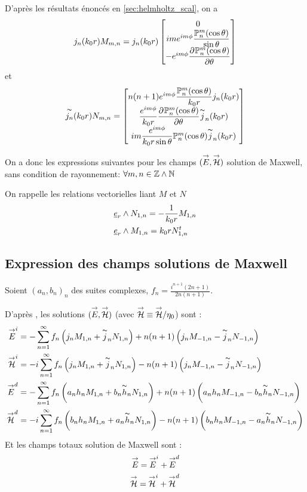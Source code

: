 D'après les résultats énoncés en \ref{sec:helmholtz_scal}, on a
\[
  j_n(k_0r)M_{m,n} = j_n(k_0r)
  \begin{bmatrix}
    0\\
    ime^{im\phi}\dfrac{\mathbb{P}^m_n(\cos\theta)}{\sin\theta}\\
    -e^{im\phi}\dfrac{\partial^{{}} \mathbb{P}^m_n(\cos\theta)}{{\partial \theta}^{{}}}\\
  \end{bmatrix}
\]
et 
\[
  \overset{\thicksim}{j_n}(k_0r)N_{m,n}=
    \begin{bmatrix}
    n(n+1)e^{im\phi}\dfrac{\mathbb{P}^m_n(\cos\theta)}{k_0r}j_n(k_0r)\\
    \dfrac{e^{im\phi}}{k_0r}\dfrac{\partial^{{}} \mathbb{P}^m_n(\cos\theta)}{{\partial \theta}^{{}}}\overset{\thicksim}{j}_n(k_0r)\\
    im\dfrac{e^{im\phi}}{k_0r\sin\theta}\mathbb{P}^m_n(\cos\theta)\overset{\thicksim}{j}_n(k_0r)
  \end{bmatrix}
\]

On a donc les expressions suivantes pour les champs $({\overset{\rightarrow}{E}},{\overset{\rightarrow}{\mathcal{H}}})$ solution de Maxwell, sans condition de rayonnement:
$\forall m,n \in \mathbb Z\wedge\mathbb N$




On rappelle les relations vectorielles liant $M$ et $N$
\begin{align*}
  &\underline{e}_r \wedge N_{1,n} = -\dfrac{1}{k_0r}M_{1,n} \\
  &\underline{e}_r \wedge M_{1,n} = k_0r N_{1,n}^t
\end{align*}

\subsection{Expression des champs solutions de Maxwell}
Soient $(a_n,b_n)_n$ des suites complexes, $f_n = \frac{i^{n+1}(2n+1)}{2n(n+1)}$.

D’après \cite{morse_methods_1953}, les solutions $({\overset{\rightarrow}{E}},{\overset{\rightarrow}{\mathcal{H}}})$ (avec ${\overset{\rightarrow}{\mathcal{H}}} \equiv {\overset{\rightarrow}{\mathcal{H}}} /\eta_0 $) sont :
\begin{align*}
  {\overset{\rightarrow}{E}}^i &= -\sum_{n=1}^\infty f_n \left( j_nM_{1,n} + \overset{\thicksim}{j}_n N_{1,n} \right) + n(n+1)\left(j_n M_{-1,n} - \overset{\thicksim}{j}_nN_{-1,n} \right)\\
  {\overset{\rightarrow}{\mathcal{H}}}^i &= -i\sum_{n=1}^\infty f_n \left( j_nM_{1,n} + \overset{\thicksim}{j}_nN_{1,n} \right) - n(n+1)\left(j_n M_{-1,n} - \overset{\thicksim}{j}_n N_{-1,n} \right)\\
  {\overset{\rightarrow}{E}}^d &= -\sum_{n=1}^\infty f_n \left( a_n h_nM_{1,n} + b_n\overset{\thicksim}{h}_nN_{1,n} \right) + n(n+1)\left(a_nh_nM_{-1,n} - b_n\overset{\thicksim}{h}_nN_{-1,n} \right)\\
  {\overset{\rightarrow}{\mathcal{H}}}^d &= -i\sum_{n=1}^\infty f_n \left( b_nh_nM_{1,n} + a_n\overset{\thicksim}{h}_nN_{1,n} \right) - n(n+1)\left(b_nh_nM_{-1,n} - a_n\overset{\thicksim}{h}_nN_{-1,n} \right)\\
\end{align*}
Et les champs totaux solution de Maxwell sont : 
\begin{align}
  {\overset{\rightarrow}{E}} = {\overset{\rightarrow}{E}}^i + {\overset{\rightarrow}{E}}^d\label{eq:solEmie}\\
  {\overset{\rightarrow}{\mathcal{H}}} = {\overset{\rightarrow}{\mathcal{H}}}^i + {\overset{\rightarrow}{\mathcal{H}}}^d\label{eq:solHmie}
\end{align}

